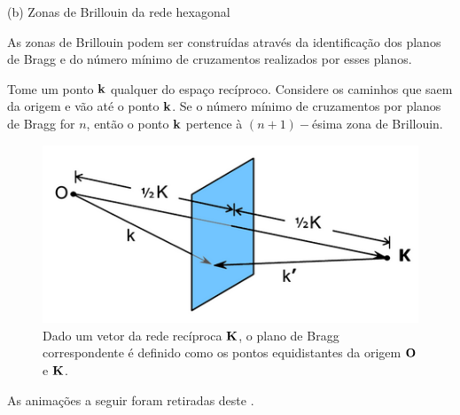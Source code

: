 \documentclass[aspectratio=169]{beamer}
\begin{document}
\begin{frame}{(b) Zonas de Brillouin da rede hexagonal}

As zonas de Brillouin podem ser construídas através da identificação dos planos de Bragg e do número mínimo de cruzamentos realizados por esses planos.

\n

Tome um ponto $\vb{k}$ qualquer do espaço recíproco. Considere os caminhos que saem da origem e vão até o ponto $\vb{k}$. Se o número mínimo de cruzamentos por planos de Bragg for $n$, então o ponto $\vb{k}$ pertence à $(n+1)-$ésima zona de Brillouin.

\begin{figure}[H]
\centering
\includegraphics[width=0.35\linewidth]{fig/bragg-plane.png}
\caption{Dado um vetor da rede recíproca $\vb{K}$, o plano de Bragg correspondente é definido como os pontos equidistantes da origem $\vb{O}$ e $\vb{K}$.}
\label{fig:bragg-plane}
\end{figure}

As animações a seguir foram retiradas deste \href{https://www.doitpoms.ac.uk/tlplib/brillouin_zones/zone_construction.php}{\color{blue}{website}}.

\end{frame}


\end{document}
